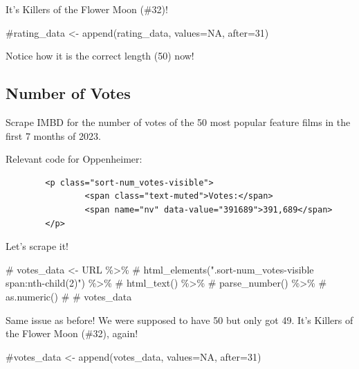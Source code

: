 \documentclass[
  letterpaper,
  DIV=11,
  numbers=noendperiod]{scrartcl}
\newenvironment{Shaded}{\begin{snugshade}}{\end{snugshade}}
\newcommand{\CommentTok}[1]{\textcolor[rgb]{0.37,0.37,0.37}{#1}}
\begin{document}
It's Killers of the Flower Moon (\#32)!

\begin{Shaded}
\begin{Highlighting}[]
\CommentTok{\#rating\_data \textless{}{-} append(rating\_data, values=NA, after=31)}
\end{Highlighting}
\end{Shaded}

Notice how it is the correct length (50) now!

\hypertarget{number-of-votes}{%
\subsection{Number of Votes}\label{number-of-votes}}

Scrape IMBD for the number of votes of the 50 most popular feature films
in the first 7 months of 2023.

Relevant code for Oppenheimer:

\begin{verbatim}
        <p class="sort-num_votes-visible">
                <span class="text-muted">Votes:</span>
                <span name="nv" data-value="391689">391,689</span>
        </p>
\end{verbatim}

Let's scrape it!

\begin{Shaded}
\begin{Highlighting}[]
\CommentTok{\# votes\_data \textless{}{-} URL \%\textgreater{}\%}
\CommentTok{\#   html\_elements(".sort{-}num\_votes{-}visible span:nth{-}child(2)") \%\textgreater{}\%}
\CommentTok{\#   html\_text() \%\textgreater{}\%}
\CommentTok{\#   parse\_number() \%\textgreater{}\%}
\CommentTok{\#   as.numeric()}
\CommentTok{\# }
\CommentTok{\# votes\_data}
\end{Highlighting}
\end{Shaded}

\begin{tcolorbox}[enhanced jigsaw, arc=.35mm, left=2mm, colbacktitle=quarto-callout-warning-color!10!white, coltitle=black, leftrule=.75mm, rightrule=.15mm, opacitybacktitle=0.6, titlerule=0mm, colframe=quarto-callout-warning-color-frame, toptitle=1mm, breakable, bottomtitle=1mm, bottomrule=.15mm, opacityback=0, title=\textcolor{quarto-callout-warning-color}{\faExclamationTriangle}\hspace{0.5em}{Warning}, toprule=.15mm, colback=white]

Same issue as before! We were supposed to have 50 but only got 49. It's
Killers of the Flower Moon (\#32), again!

\begin{Shaded}
\begin{Highlighting}[]
\CommentTok{\#votes\_data \textless{}{-} append(votes\_data, values=NA, after=31)}
\end{Highlighting}
\end{Shaded}

\end{tcolorbox}
\end{document}
